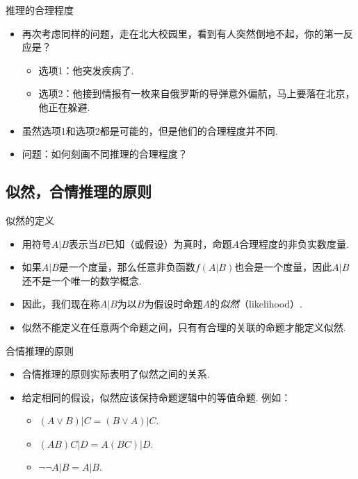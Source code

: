 \begin{frame}{推理的合理程度}
\begin{itemize}
    \item 再次考虑同样的问题，走在北大校园里，看到有人突然倒地不起，你的第一反应是？
    \begin{itemize}
        \item 选项1：他突发疾病了.
        \item 选项2：他接到情报有一枚来自俄罗斯的导弹意外偏航，马上要落在北京，他正在躲避.
    \end{itemize}
    \item 虽然选项1和选项2都是可能的，但是他们的合理程度并不同.
    \item 问题：如何刻画不同推理的合理程度？
\end{itemize}
\end{frame}

\subsection{似然，合情推理的原则}
\begin{frame}{似然的定义}
\begin{itemize}
    \item 用符号$A|B$表示当$B$已知（或假设）为真时，命题$A$合理程度的非负实数度量.
    \item 如果$A|B$是一个度量，那么任意非负函数$f(A|B)$也会是一个度量，因此$A|B$还不是一个唯一的数学概念.
    \item 因此，我们现在称$A|B$为以$B$为假设时命题$A$的\emph{似然}（likelihood）.
    \item 似然不能定义在任意两个命题之间，只有有合理的关联的命题才能定义似然.
\end{itemize}
\end{frame}

\begin{frame}{合情推理的原则}
\begin{itemize}
    \item 合情推理的原则实际表明了似然之间的关系.
    \item 给定相同的假设，似然应该保持命题逻辑中的等值命题. 例如：
    \begin{itemize}
        \item $(A\vee B) | C=(B\vee A) | C$.
        \item $(AB)C|D=A(BC)|D$.
        \item $\neg\neg A|B=A|B$.
    \end{itemize}
\end{itemize}
\end{frame}

